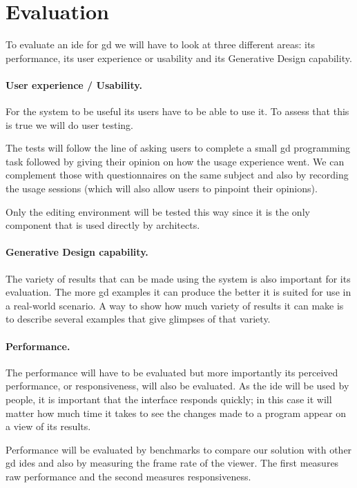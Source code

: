 \documentclass{./llncs2e/llncs}
\begin{document}
\section{Evaluation}
	To evaluate an \ac{ide} for \ac{gd} we will have to look at three different areas:
	its performance, its user experience or usability and its Generative Design capability.
	
	\paragraph{User experience / Usability.}
	For the system to be useful its users have to be able to use it.
	To assess that this is true we will do user testing.
	
	The tests will follow the line of asking users to complete a small \ac{gd} programming task followed by giving their opinion on how the usage experience went.
	We can complement those with questionnaires on the same subject and also by recording the usage sessions (which will also allow users to pinpoint their opinions).
	
	Only the editing environment will be tested this way since it is the only component that is used directly by architects.
	
	\paragraph{Generative Design capability.}
	The variety of results that can be made using the system is also important for its evaluation.
	The more \ac{gd} examples it can produce the better it is suited for use in a real-world scenario.
	A way to show how much variety of results it can make is to describe several examples that give glimpses of that variety.
	
	\paragraph{Performance.}
	The performance will have to be evaluated but more importantly its perceived performance, or responsiveness, will also be evaluated.
	As the \ac{ide} will be used by people, it is important that the interface responds quickly;
	in this case it will matter how much time it takes to see the changes made to a program appear on a view of its results.
	
	Performance will be evaluated by benchmarks to compare our solution with other \ac{gd} \ac{ide}s and also by measuring the frame rate of the viewer.
	The first measures raw performance and the second measures responsiveness.
\end{document}
